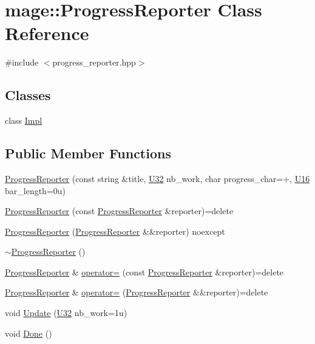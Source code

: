 \hypertarget{classmage_1_1_progress_reporter}{}\section{mage\+:\+:Progress\+Reporter Class Reference}
\label{classmage_1_1_progress_reporter}


{\ttfamily \#include $<$progress\+\_\+reporter.\+hpp$>$}

\subsection*{Classes}
\begin{DoxyCompactItemize}
\item 
class \hyperlink{classmage_1_1_progress_reporter_1_1_impl}{Impl}
\end{DoxyCompactItemize}
\subsection*{Public Member Functions}
\begin{DoxyCompactItemize}
\item 
\hyperlink{classmage_1_1_progress_reporter_a900eb503981e2d83b721ce0612950285}{Progress\+Reporter} (const string \&title, \hyperlink{namespacemage_a41c104c036fba3756a74e19f793eeaa1}{U32} nb\+\_\+work, char progress\+\_\+char=\textquotesingle{}+\textquotesingle{}, \hyperlink{namespacemage_af69057eec1ce005c1c3b34ae33486f16}{U16} bar\+\_\+length=0u)
\item 
\hyperlink{classmage_1_1_progress_reporter_a681d23ec19019c04a8a977c4f6f280ea}{Progress\+Reporter} (const \hyperlink{classmage_1_1_progress_reporter}{Progress\+Reporter} \&reporter)=delete
\item 
\hyperlink{classmage_1_1_progress_reporter_a811686b20299f63476c5a5b17c6fa443}{Progress\+Reporter} (\hyperlink{classmage_1_1_progress_reporter}{Progress\+Reporter} \&\&reporter) noexcept
\item 
\hyperlink{classmage_1_1_progress_reporter_aa543239c6dd4474a77cf4cf6904c1b26}{$\sim$\+Progress\+Reporter} ()
\item 
\hyperlink{classmage_1_1_progress_reporter}{Progress\+Reporter} \& \hyperlink{classmage_1_1_progress_reporter_aa98411a059ad0e77ca53d064176f3a86}{operator=} (const \hyperlink{classmage_1_1_progress_reporter}{Progress\+Reporter} \&reporter)=delete
\item 
\hyperlink{classmage_1_1_progress_reporter}{Progress\+Reporter} \& \hyperlink{classmage_1_1_progress_reporter_adfc77427eaff8caf71c1995bf986edc5}{operator=} (\hyperlink{classmage_1_1_progress_reporter}{Progress\+Reporter} \&\&reporter)=delete
\item 
void \hyperlink{classmage_1_1_progress_reporter_aee55b3ced46f7512634b0443ff9807f5}{Update} (\hyperlink{namespacemage_a41c104c036fba3756a74e19f793eeaa1}{U32} nb\+\_\+work=1u)
\item 
void \hyperlink{classmage_1_1_progress_reporter_a11d758647ac2082bc296ab53a7454eaa}{Done} ()
\end{DoxyCompactItemize}
